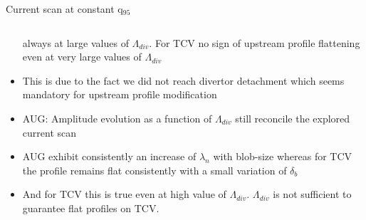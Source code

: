\documentclass[10pt, compress]{beamer}
\begin{document}
\begin{frame}{Current scan at constant q$_{95}$}
\begin{columns}
\begin{column}{0.4\textwidth}
\begin{itemize}
          \alert{always at large values of 
          $\Lambda_{div}$}. For TCV no sign of upstream profile flattening \alert{even
            at very large values of $\Lambda_{div}$}
        \item<6|only@6> This is due to the fact we did not reach
          divertor detachment which \alert{seems mandatory for
            upstream profile modification}  
        \item<7|only@7> AUG: Amplitude evolution as a function of $\Lambda_{div}$ 
          still reconcile the explored current scan
        \item<8|only@8> AUG exhibit consistently an increase of
          $\lambda_n$ with blob-size whereas for TCV the profile
          remains flat consistently with a small variation of
          $\delta_b$
        \item<9|only@9> And for TCV this is true even at high value of
          $\Lambda_{div}$. \alert{$\Lambda_{div}$ is not sufficient to
          guarantee flat profiles on TCV.}
      \end{itemize}
    \end{column}
  \end{columns}
\end{frame}
\end{document}
